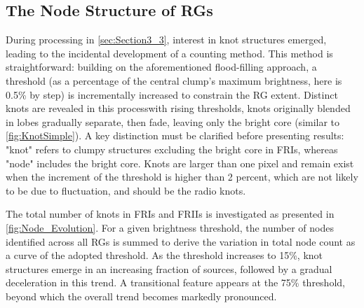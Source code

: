 \documentclass{aa}
\begin{document}
\subsection{The Node Structure of RGs}\label{sec:Section4_4}

During processing in \autoref{sec:Section3_3}, interest in knot structures emerged, leading to the incidental development of a counting method. This method is straightforward: building on the aforementioned flood-filling approach, a threshold (as a percentage of the central clump's maximum brightness, here is 0.5\% by step) is incrementally increased to constrain the RG extent. Distinct knots are revealed in this process\textemdash with rising thresholds, knots originally blended in lobes gradually separate, then fade, leaving only the bright core (similar to \autoref{fig:KnotSimple}). A key distinction must be clarified before presenting results: "knot" refers to clumpy structures excluding the bright core in FRIs, whereas "node" includes the bright core.
Knots are larger than one pixel and remain exist when the increment of the threshold is higher than 2 percent, which are not likely to be due to fluctuation, and should be the radio knots.

The total number of knots in FRIs and FRIIs is investigated as presented in \autoref{fig:Node_Evolution}. For a given brightness threshold, the number of nodes identified across all RGs is summed to derive the variation in total node count as a curve of the adopted threshold.
As the threshold increases to 15\%, knot structures emerge in an increasing fraction of sources, followed by a gradual deceleration in this trend. A transitional feature appears at the 75\% threshold, beyond which the overall trend becomes markedly pronounced.
\end{document}
